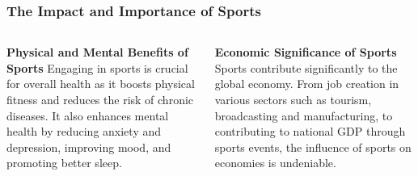 \documentclass[5pt]{beamer}
\begin{document}
\begin{frame}
\frametitle{The Impact and Importance of Sports}
\begin{columns}
\begin{column}{0.45\textwidth}
\begin{block}{\textbf{Physical and Mental Benefits of Sports}}
Engaging in sports is crucial for overall health as it boosts physical fitness and reduces the risk of chronic diseases. It also enhances mental health by reducing anxiety and depression, improving mood, and promoting better sleep.
\end{block}
\end{column}
\begin{column}{0.45\textwidth}
\begin{block}{\textbf{Economic Significance of Sports}}
Sports contribute significantly to the global economy. From job creation in various sectors such as tourism, broadcasting and manufacturing, to contributing to national GDP through sports events, the influence of sports on economies is undeniable.
\end{block}
\end{column}
\end{columns}
\end{frame}
\end{document}

